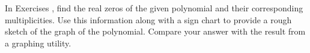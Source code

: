 {\noindent In Exercises}
{, find the real zeros of the given polynomial and their corresponding multiplicities.  Use this information along with a sign chart to provide a rough sketch of the graph of the polynomial.  Compare your answer with the result from a graphing utility. \label{polygraphexercise}}

